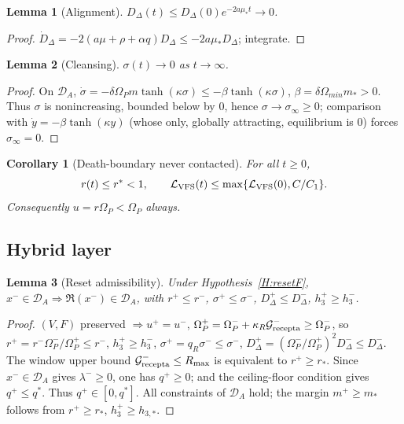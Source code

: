 \documentclass[11pt,a4paper]{article}
\newcommand{\DA}{\mathcal D_A}
\newcommand{\LV}{\mathcal L_{\rm VFS}}
\newcommand{\Grec}{\mathcal G_{\rm recepta}}
\newcommand{\Om}{\Omega_P}
\newcommand{\reset}{\mathfrak{R}}
\theoremstyle{plain}
\newtheorem{lemma}{Lemma}
\newtheorem{corollary}{Corollary}
\theoremstyle{definition}
\theoremstyle{remark}
\begin{document}
\begin{lemma}[Alignment]\label{lem:alignF}
$D_\Delta(t)\le D_\Delta(0)e^{-2a\mu_*t}\to0$.
\end{lemma}
\begin{proof}
$\dot D_\Delta=-2(a\mu+\rho+\alpha q)D_\Delta\le-2a\mu_*D_\Delta$; integrate.
\end{proof}

\begin{lemma}[Cleansing]\label{lem:cleanF}
$\sigma(t)\to0$ as $t\to\infty$.
\end{lemma}
\begin{proof}
On $\DA$, $\dot\sigma=-\delta\Om m\tanh(\kappa\sigma)\le-\beta\tanh(\kappa\sigma)$,
$\beta=\delta\Omega_{min}m_*>0$. Thus $\sigma$ is nonincreasing, bounded below by
$0$, hence $\sigma\to\sigma_\infty\ge0$; comparison with
$\dot y=-\beta\tanh(\kappa y)$ (whose only, globally attracting, equilibrium is
$0$) forces $\sigma_\infty=0$.
\end{proof}

\begin{corollary}[Death-boundary never contacted]\label{cor:barrierF}
For all $t\ge0$,
\begin{equation*}
  r(t)\le r^*<1,\qquad
  \LV(t)\le\max\{\LV(0),C/C_1\}.
\end{equation*}
Consequently $u=r\Om<\Om$ always.
\end{corollary}

\subsection{Hybrid layer}

\begin{lemma}[Reset admissibility]\label{lem:resetF}
Under Hypothesis~\ref{H:resetF}, $x^-\in\DA\Rightarrow\reset(x^-)\in\DA$, with
$r^+\le r^-$, $\sigma^+\le\sigma^-$, $D_\Delta^+\le D_\Delta^-$, $h_3^+\ge h_3^-$.
\end{lemma}
\begin{proof}
$(V,F)$ preserved $\Rightarrow u^+=u^-$, $\Om^+=\Om^-+\kappa_R\Grec^-\ge\Om^-$, so
$r^+=r^-\Om^-/\Om^+\le r^-$, $h_3^+\ge h_3^-$, $\sigma^+=q_R\sigma^-\le\sigma^-$,
$D_\Delta^+=(\Om^-/\Om^+)^2D_\Delta^-\le D_\Delta^-$. The window upper bound
$\Grec^-\le R_{\max}$ is equivalent to $r^+\ge r_*$. Since $x^-\in\DA$ gives $\lambda^-\ge0$, one has $q^+\ge0$; and the ceiling-floor condition gives $q^+\le q^*$. Thus $q^+\in[0,q^*]$. All constraints of $\DA$ hold; the margin
$m^+\ge m_*$ follows from $r^+\ge r_*$, $h_3^+\ge h_{3,*}$.
\end{proof}
\end{document}
